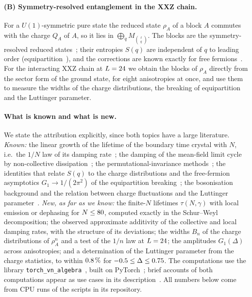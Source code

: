 \documentclass[11pt]{article}
\begin{document}
\paragraph{(B) Symmetry-resolved entanglement in the XXZ chain.} For a $U(1)$-symmetric pure state the reduced state
$\rho_A$ of a block $A$ commutes with the charge $Q_A$ of $A$, so it lies in $\bigoplus_qM_{\binom\ell q}$. The blocks
are the symmetry-resolved reduced states~\cite{laflorencie2014,goldstein2018,xavier2018}; their entropies $S(q)$ are
independent of $q$ to leading order (equipartition~\cite{xavier2018}), and the corrections are known exactly for free
fermions~\cite{bonsignori2019}. For the interacting XXZ chain at $L=24$ we obtain the blocks of $\rho_A$ directly
from the sector form of the ground state, for eight anisotropies at once, and use them to measure the widths of the
charge distributions, the breaking of equipartition and the Luttinger parameter.

\paragraph{What is known and what is new.} We state the attribution explicitly, since both topics have a large
literature. \emph{Known:} the linear growth of the lifetime of the boundary time crystal with $N$, i.e.\ the $1/N$
law of its damping rate~\cite{liu2026,nemeth2025}; the damping of the mean-field limit cycle by non-collective
dissipation~\cite{piccitto2021}; the permutational-invariance methods~\cite{chase2008,baragiola2010,gegg2017,kirton2017,
shammah2018}; the identities that relate $S(q)$ to the charge distributions and the free-fermion asymptotics
$G_1\to1/(2\pi^2)$ of the equipartition breaking~\cite{bonsignori2019}; the bosonisation background and the
relation between charge fluctuations and the Luttinger parameter~\cite{goldstein2018,song2012,estienne2021}.
\emph{New, as far as we know:} the finite-$N$ lifetimes $\tau(N,\gamma)$ with local emission or dephasing for
$N\le80$, computed exactly in the Schur--Weyl decomposition; the observed approximate additivity of the collective
and local damping rates, with the structure of its deviations; the widths $B_n$ of the charge distributions of
$\rho_A^n$ and a test of the $1/n$ law at $L=24$; the amplitudes $G_1(\Delta)$ across anisotropies; and a
determination of the Luttinger parameter from the charge statistics, to within $0.8\,\%$ for
$-0.5\le\Delta\le0.75$. The computations use the library
\texttt{torch\_vn\_algebra}~\cite{lib}, built on PyTorch~\cite{paszke2019}; brief accounts of both computations appear
as use cases in its description~\cite{lib}. All numbers below come from CPU runs of the scripts in its repository.
\end{document}
